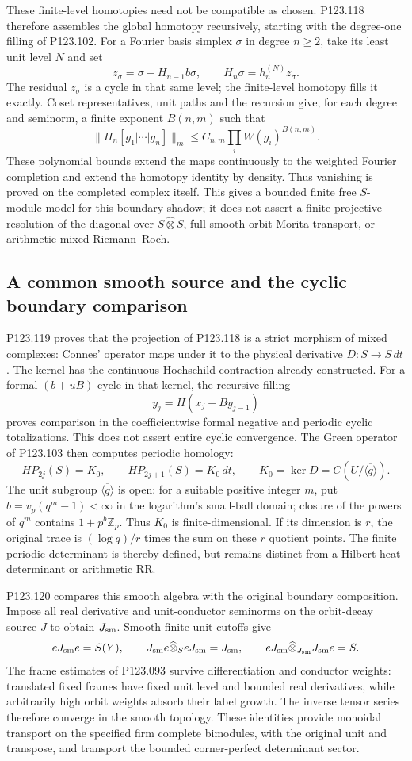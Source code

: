 These finite-level homotopies need not be compatible as chosen.
P123.118 therefore assembles the global homotopy recursively, starting
with the degree-one filling of P123.102. For a Fourier basis simplex
$\sigma$ in degree $n\geq2$, take its least unit level $N$ and set
\[
 z_\sigma=\sigma-H_{n-1}b\sigma,\qquad
 H_n\sigma=h_n^{(N)}z_\sigma.
\]
The residual $z_\sigma$ is a cycle in that same level; the finite-level
homotopy fills it exactly. Coset representatives, unit paths and the
recursion give, for each degree and seminorm, a finite exponent $B(n,m)$
such that
\[
 \|H_n[g_1|\cdots|g_n]\|_m
       \leq C_{n,m}\prod_i W(g_i)^{B(n,m)}.
\]
These polynomial bounds extend the maps continuously to the weighted
Fourier completion and extend the homotopy identity by density.
Thus vanishing is proved on the completed complex itself. This gives a
bounded finite free $S$-module model for this boundary shadow; it does
not assert a finite projective resolution of the diagonal over
$S\widehat\otimes S$, full smooth orbit Morita transport, or arithmetic
mixed Riemann--Roch.

\subsection{A common smooth source and the cyclic boundary comparison}
P123.119 proves that the projection of P123.118 is a strict morphism
of mixed complexes: Connes' operator maps under it to the physical
derivative $D:S\to S\,dt$. The kernel has the continuous Hochschild
contraction already constructed. For a formal $(b+uB)$-cycle in that
kernel, the recursive filling
\[
 y_j=H(x_j-By_{j-1})
\]
proves comparison in the coefficientwise formal negative and periodic
cyclic totalizations. This does not assert entire cyclic convergence.
The Green operator of P123.103 then computes periodic homology:
\[
 HP_{2j}(S)=K_0,\qquad HP_{2j+1}(S)=K_0\,dt,
 \qquad K_0=\ker D=C(U/\overline{\langle q\rangle}).
\]
The unit subgroup $\overline{\langle q\rangle}$ is open: for a suitable
positive integer $m$, put $b=v_p(q^m-1)<\infty$ in the logarithm's
small-ball domain; closure of the powers of $q^m$ contains
$1+p^b\mathbb Z_p$. Thus $K_0$ is finite-dimensional. If its dimension
is $r$, the original trace is $(\log q)/r$ times the sum on these
$r$ quotient points. The finite periodic determinant is thereby defined,
but remains distinct from a Hilbert heat determinant or arithmetic RR.

P123.120 compares this smooth algebra with the original boundary
composition. Impose all real derivative and unit-conductor seminorms
on the orbit-decay source $J$ to obtain $J_{\rm sm}$. Smooth finite-unit
cutoffs give
\[
 eJ_{\rm sm}e=S(Y),\qquad
 J_{\rm sm}e\widehat\otimes_S eJ_{\rm sm}=J_{\rm sm},\qquad
 eJ_{\rm sm}\widehat\otimes_{J_{\rm sm}}J_{\rm sm}e=S.
\]
The frame estimates of P123.093 survive differentiation and conductor
weights: translated fixed frames have fixed unit level and bounded
real derivatives, while arbitrarily high orbit weights absorb their
label growth. The inverse tensor series therefore converge in the
smooth topology. These identities provide monoidal transport on the
specified firm complete bimodules, with the original unit and transpose,
and transport the bounded corner-perfect determinant sector.

